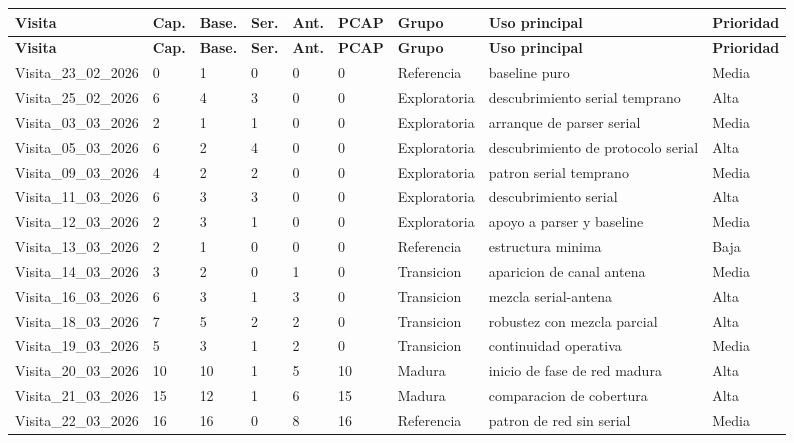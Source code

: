 \begin{longtable}{|p{3.0cm}|p{1.2cm}|p{1.2cm}|p{1.2cm}|p{1.2cm}|p{1.2cm}|p{2.2cm}|p{3.4cm}|p{1.7cm}|}
\hline
\textbf{Visita} & \textbf{Cap.} & \textbf{Base.} & \textbf{Ser.} & \textbf{Ant.} & \textbf{PCAP} & \textbf{Grupo} & \textbf{Uso principal} & \textbf{Prioridad} \\
\hline
\endfirsthead
\hline
\textbf{Visita} & \textbf{Cap.} & \textbf{Base.} & \textbf{Ser.} & \textbf{Ant.} & \textbf{PCAP} & \textbf{Grupo} & \textbf{Uso principal} & \textbf{Prioridad} \\
\hline
\endhead
\hline
\endfoot
\hline
\endlastfoot
Visita\_23\_02\_2026 & 0 & 1 & 0 & 0 & 0 & Referencia & baseline puro & Media \\
\hline
Visita\_25\_02\_2026 & 6 & 4 & 3 & 0 & 0 & Exploratoria & descubrimiento serial temprano & Alta \\
\hline
Visita\_03\_03\_2026 & 2 & 1 & 1 & 0 & 0 & Exploratoria & arranque de parser serial & Media \\
\hline
Visita\_05\_03\_2026 & 6 & 2 & 4 & 0 & 0 & Exploratoria & descubrimiento de protocolo serial & Alta \\
\hline
Visita\_09\_03\_2026 & 4 & 2 & 2 & 0 & 0 & Exploratoria & patron serial temprano & Media \\
\hline
Visita\_11\_03\_2026 & 6 & 3 & 3 & 0 & 0 & Exploratoria & descubrimiento serial & Alta \\
\hline
Visita\_12\_03\_2026 & 2 & 3 & 1 & 0 & 0 & Exploratoria & apoyo a parser y baseline & Media \\
\hline
Visita\_13\_03\_2026 & 2 & 1 & 0 & 0 & 0 & Referencia & estructura minima & Baja \\
\hline
Visita\_14\_03\_2026 & 3 & 2 & 0 & 1 & 0 & Transicion & aparicion de canal antena & Media \\
\hline
Visita\_16\_03\_2026 & 6 & 3 & 1 & 3 & 0 & Transicion & mezcla serial-antena & Alta \\
\hline
Visita\_18\_03\_2026 & 7 & 5 & 2 & 2 & 0 & Transicion & robustez con mezcla parcial & Alta \\
\hline
Visita\_19\_03\_2026 & 5 & 3 & 1 & 2 & 0 & Transicion & continuidad operativa & Media \\
\hline
Visita\_20\_03\_2026 & 10 & 10 & 1 & 5 & 10 & Madura & inicio de fase de red madura & Alta \\
\hline
Visita\_21\_03\_2026 & 15 & 12 & 1 & 6 & 15 & Madura & comparacion de cobertura & Alta \\
\hline
Visita\_22\_03\_2026 & 16 & 16 & 0 & 8 & 16 & Referencia & patron de red sin serial & Media \\

\end{longtable}
